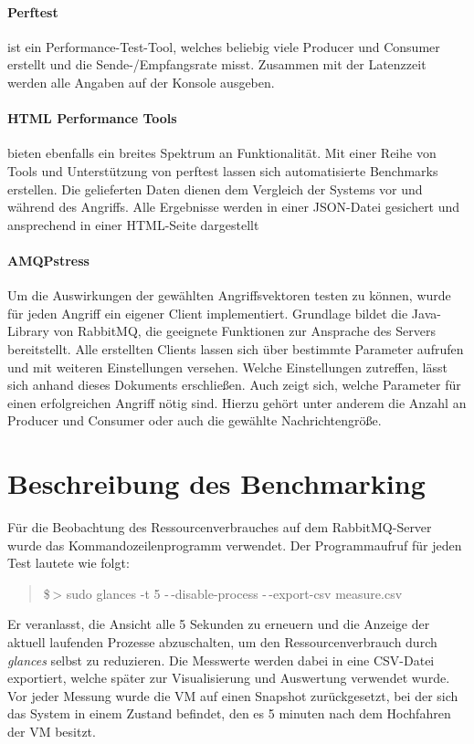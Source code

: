 \documentclass[	a4paper,
			11pt,
			titlepage,
			oneside,
			fleqn,
			listof=totoc,
			parskip,
			numbers=noenddot]{scrartcl}
\begin{document}
	\paragraph{Perftest} ist ein Performance-Test-Tool, welches beliebig viele Producer und Consumer erstellt und die Sende-/Empfangsrate misst. Zusammen mit der Latenzzeit werden alle Angaben auf der Konsole ausgeben.

	\paragraph{HTML Performance Tools} bieten ebenfalls ein breites Spektrum an Funktionalität. Mit einer Reihe von Tools und Unterstützung von perftest lassen sich automatisierte Benchmarks erstellen. Die gelieferten Daten dienen dem Vergleich der Systems vor und während des Angriffs. Alle Ergebnisse werden in einer JSON-Datei gesichert und ansprechend in einer HTML-Seite dargestellt

	
	\paragraph{AMQPstress} Um die Auswirkungen der gewählten Angriffsvektoren testen zu können, wurde für jeden Angriff ein eigener Client implementiert. Grundlage bildet die Java-Library von RabbitMQ, die geeignete Funktionen zur Ansprache des Servers bereitstellt. Alle erstellten Clients lassen sich über bestimmte Parameter aufrufen und mit weiteren Einstellungen versehen. Welche Einstellungen zutreffen, lässt sich anhand dieses Dokuments erschließen. Auch zeigt sich, welche Parameter für einen erfolgreichen Angriff nötig sind. Hierzu gehört unter anderem die Anzahl an Producer und Consumer oder auch die gewählte Nachrichtengröße.



%	
%
\clearpage
\section*{Beschreibung des Benchmarking}
	
	Für die Beobachtung des Ressourcenverbrauches auf dem RabbitMQ-Server wurde das Kommandozeilenprogramm  verwendet. Der Programmaufruf für jeden Test lautete wie folgt:
	\begin{quote}
		\ttfamily
		\$\,> sudo glances -t 5 -\,-disable-process -\,-export-csv measure.csv
	\end{quote}
	Er veranlasst, die Ansicht alle 5 Sekunden zu erneuern und die Anzeige der aktuell laufenden Prozesse abzuschalten, um den Ressourcenverbrauch durch \textsl{glances} selbst zu reduzieren.
	Die Messwerte werden dabei in eine CSV-Datei exportiert, welche später zur Visualisierung und Auswertung verwendet wurde.
	Vor jeder Messung wurde die VM auf einen Snapshot zurückgesetzt, bei der sich das System in einem Zustand befindet, den es 5 minuten nach dem Hochfahren der VM besitzt.
	
\end{document}
